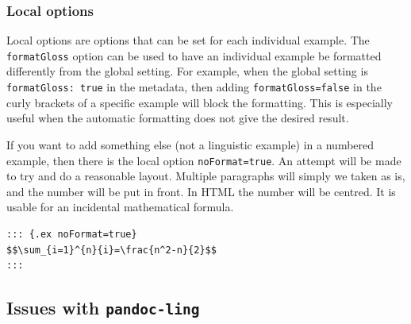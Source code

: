 \documentclass[
]{article}
\begin{document}
\hypertarget{local-options}{%
\subsubsection{Local options}\label{local-options}}

Local options are options that can be set for each individual example.
The \texttt{formatGloss} option can be used to have an individual
example be formatted differently from the global setting. For example,
when the global setting is \texttt{formatGloss:\ true} in the metadata,
then adding \texttt{formatGloss=false} in the curly brackets of a
specific example will block the formatting. This is especially useful
when the automatic formatting does not give the desired result.

If you want to add something else (not a linguistic example) in a
numbered example, then there is the local option \texttt{noFormat=true}.
An attempt will be made to try and do a reasonable layout. Multiple
paragraphs will simply we taken as is, and the number will be put in
front. In HTML the number will be centred. It is usable for an
incidental mathematical formula.

\begin{verbatim}
::: {.ex noFormat=true}
$$\sum_{i=1}^{n}{i}=\frac{n^2-n}{2}$$
:::
\end{verbatim}

\begin{samepage}
\begin{exe} \judgewidth{}
  \ex [] { \[\sum_{i=1}^{n}{i}=\frac{n^2-n}{2}\]\\
   }
  \label{ex4.14}
\end{exe}
\end{samepage}

\hypertarget{issues-with-pandoc-ling}{%
\subsection{\texorpdfstring{Issues with
\texttt{pandoc-ling}}{Issues with pandoc-ling}}\label{issues-with-pandoc-ling}}
\end{document}
